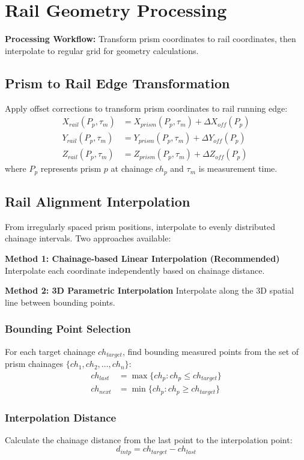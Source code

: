 \documentclass{article}
\begin{document}
\section{Rail Geometry Processing}
\textbf{Processing Workflow:} Transform prism coordinates to rail coordinates, then interpolate to regular grid for geometry calculations.

\subsection{Prism to Rail Edge Transformation}
Apply offset corrections to transform prism coordinates to rail running edge:
\begin{align}
X_{rail}(P_p, \tau_m) &= X_{prism}(P_p, \tau_m) + \Delta X_{off}(P_p) \\
Y_{rail}(P_p, \tau_m) &= Y_{prism}(P_p, \tau_m) + \Delta Y_{off}(P_p) \\
Z_{rail}(P_p, \tau_m) &= Z_{prism}(P_p, \tau_m) + \Delta Z_{off}(P_p)
\end{align}
where $P_p$ represents prism $p$ at chainage $ch_p$ and $\tau_m$ is measurement time.

\subsection{Rail Alignment Interpolation}
From irregularly spaced prism positions, interpolate to evenly distributed chainage intervals. Two approaches available:

\textbf{Method 1: Chainage-based Linear Interpolation (Recommended)}
Interpolate each coordinate independently based on chainage distance.

\textbf{Method 2: 3D Parametric Interpolation}
Interpolate along the 3D spatial line between bounding points.

\subsubsection{Bounding Point Selection}
For each target chainage $ch_{target}$, find bounding measured points from the set of prism chainages $\{ch_1, ch_2, \ldots, ch_n\}$:
\begin{align}
ch_{last} &= \max\{ch_p : ch_p \leq ch_{target}\} \\
ch_{next} &= \min\{ch_p : ch_p \geq ch_{target}\}
\end{align}

\subsubsection{Interpolation Distance}
Calculate the chainage distance from the last point to the interpolation point:
\begin{equation}
d_{intp} = ch_{target} - ch_{last}
\end{equation}
\end{document}
